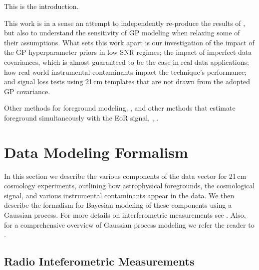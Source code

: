\documentclass[a4paper,fleqn,usenatbib]{mnras}
\begin{document}
This is the introduction.


\citet{Mertens2018}


This work is in a sense an attempt to independently re-produce the results of , but also to understand the sensitivity of GP modeling when relaxing some of their assumptions.
What sets this work apart is our investigation of the impact of the GP hyperparameter priors in low SNR regimes; the impact of imperfect data covariances, which is almost guaranteed to be the case in real data applications; how real-world instrumental contaminants impact the technique's performance; and signal loss tests using 21\,cm templates that are not drawn from the adopted GP covariance.

Other methods for foreground modeling, \citet{Chapman2012}, and other methods that estimate foreground simultaneously with the EoR signal, \citet{Zhang2016}, \citet{Sims2018}.

\section{Data Modeling Formalism}
\label{sec:formalism}

In this section we describe the various components of the data vector for 21\,cm cosmology experiments, outlining how astrophysical foregrounds, the cosmological signal, and various instrumental contaminants appear in the data.
We then describe the formalism for Bayesian modeling of these components using a Gaussian process.
For more details on interferometric measurements see \citet{Hamaker1996, Smirnov2011}.
Also, for a comprehensive overview of Gaussian process modeling we refer the reader to \citet{Rasmussen2006}.


\subsection{Radio Inteferometric Measurements}
\label{sec:rime}
\end{document}
